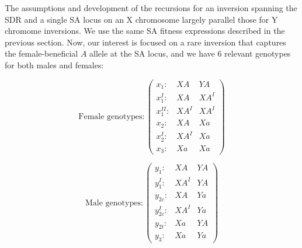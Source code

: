 \documentclass{article}
\begin{document}
\begin{appendices}
The assumptions and development of the recursions for an inversion spanning the SDR and a single SA locus on an X chromosome largely parallel those for Y chromome inversions. We use the same SA fitness expressions described in the previous section. Now, our interest is focused on a rare inversion that captures the female-beneficial $A$ allele at the SA locus, and we have $6$ relevant genotypes for both males and females:

\begin{equation*}
	\text{Female genotypes}:\left( \begin{array}{cc|c}
		x_1:        & XA   & YA \\
		x^I_{1}:    & XA   & XA^I \\
		x^{II}_{1}: & XA^I & XA^I \\
		x_{2}:      & XA   & Xa \\
		x^I_{2}:    & XA^I & Xa \\
		x_{3}:      & Xa   & Xa 
	\end{array} \right)
\end{equation*}

\begin{equation*}
	\text{Male genotypes}:\left( \begin{array}{cc|c}
		y_1:      & XA   & YA \\
		y^I_{1}:  & XA^I & YA \\
		y_{2c}:   & XA   & Ya \\
		y^I_{2c}: & XA^I & Ya \\
		y_{2t}:   & Xa & YA \\
		y_{3}:    & Xa & Ya 
	\end{array} \right)
\end{equation*}



\end{appendices}
\end{document}
